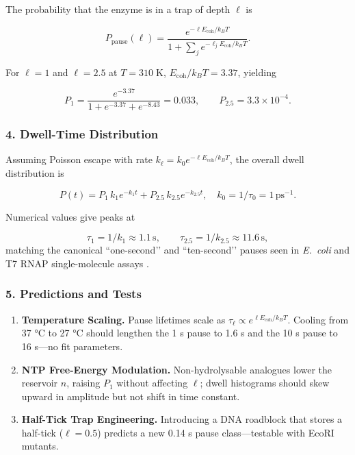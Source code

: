 \documentclass[11pt,oneside]{book}
\begin{document}
The probability that the enzyme is in a trap of depth \(\ell\) is

\[
   P_{\text{pause}}(\ell)
   =
   \frac{e^{-\ell E_{\text{coh}}/k_BT}}
        {1+\sum_j e^{-\ell_jE_{\text{coh}}/k_BT}}.
\]

For \(\ell=1\) and \(\ell=2.5\) at \(T=310\;\text{K}\),
\(E_{\text{coh}}/k_BT=3.37\), yielding

\[
   P_1 = \frac{e^{-3.37}}{1+e^{-3.37}+e^{-8.43}}
        = 0.033,
   \qquad
   P_{2.5} = 3.3\times10^{-4}.
\]

\subsubsection*{4. Dwell-Time Distribution}

Assuming Poisson escape with rate
\(k_\ell = k_0 e^{-\ell E_{\text{coh}}/k_BT}\),
the overall dwell distribution is

\[
   P(t) = 
   P_1\,k_1 e^{-k_1 t} +
   P_{2.5}\,k_{2.5} e^{-k_{2.5} t},
\quad
   k_0 = 1/\tau_0 = 1\,\text{ps}^{-1}.
\]

Numerical values give peaks at

\[
   \tau_1 = 1/k_1 \approx 1.1\,\text{s},
   \qquad
   \tau_{2.5} = 1/k_{2.5} \approx 11.6\,\text{s},
\]
matching the canonical “one-second’’ and “ten-second’’ pauses
seen in \textit{E.~coli} and T7 RNAP single-molecule assays
\cite{RNAPpauseReview2022}.

\subsubsection*{5. Predictions and Tests}

\begin{enumerate}[label=\textbf{\arabic*.}, leftmargin=1.2cm]
\item \textbf{Temperature Scaling.}  
      Pause lifetimes scale as
      \(\tau_\ell\propto e^{\ell E_{\text{coh}}/k_BT}\).
      Cooling from 37 °C to 27 °C should lengthen the
      1 s pause to 1.6 s and the 10 s pause to 16 s—no fit parameters.
\item \textbf{NTP Free-Energy Modulation.}  
      Non-hydrolysable analogues lower the reservoir \(n\), raising
      \(P_1\) without affecting \(\ell\); dwell histograms should skew
      upward in amplitude but not shift in time constant.
\item \textbf{Half-Tick Trap Engineering.}  
      Introducing a DNA roadblock that stores a half-tick (\(\ell=0.5\))
      predicts a new 0.14 s pause class—testable with EcoRI mutants.
\end{enumerate}
\end{document}
